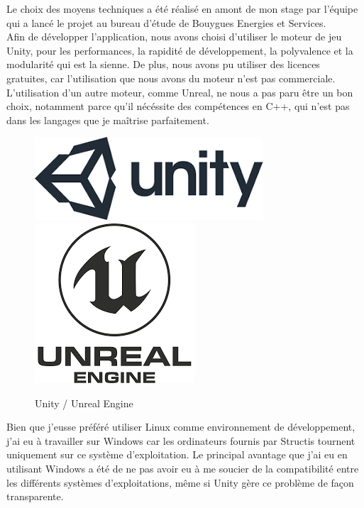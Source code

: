 \documentclass[a4paper]{article}
\begin{document}
    Le choix des moyens techniques a été réalisé en amont de mon stage par l'équipe qui a lancé le projet au bureau d'étude de Bouygues Energies et Services. \\ 

    Afin de développer l'application, nous avons choisi d'utiliser le moteur de jeu Unity, pour les performances, la rapidité de développement, la polyvalence et la modularité qui est la sienne. De plus, nous avons pu utiliser des licences gratuites, car l'utilisation que nous avons du moteur n'est pas commerciale. L'utilisation d'un autre moteur, comme Unreal, ne nous a pas paru être un bon choix, notamment parce qu'il nécéssite des compétences en C++, qui n'est pas dans les langages que je maîtrise parfaitement. \\

    \begin{figure}[H]
        \centering
        \includegraphics[scale=0.5]{img/logo-unity}
        \hspace{10pt}
        \includegraphics[scale=0.5]{img/logo-unreal}
        \caption{Unity / Unreal Engine}
    \end{figure}

    Bien que j'eusse préféré utiliser Linux comme environnement de développement, j'ai eu à travailler sur Windows car les ordinateurs fournis par Structis tournent uniquement sur ce système d'exploitation. Le principal avantage que j'ai eu en utilisant Windows a été de ne pas avoir eu à me soucier de la compatibilité entre les différents systèmes d'exploitations, même si Unity gère ce problème de façon transparente. \\
\end{document}

